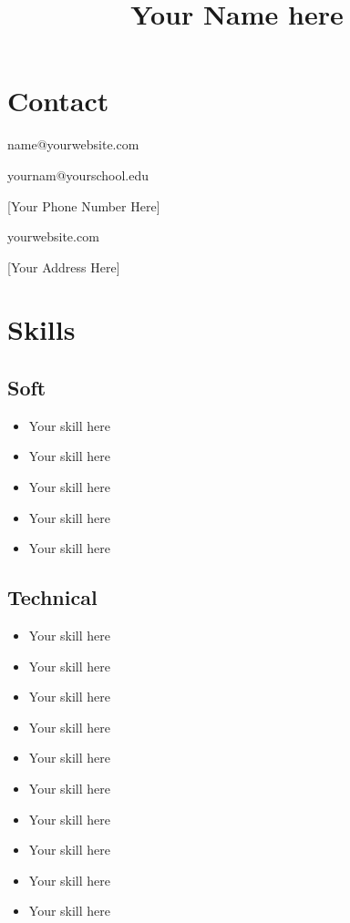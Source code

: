 \documentclass[12pt, letterpaper]{memoir}
\title{Your Name here}
\author{}
\date{}
\begin{document}
\maketitle

\hspace{-8mm}
\begin{minipage}[t]{0.3\textwidth}
\section*{Contact}
\vspace{-.5\baselineskip}
 name@yourwebsite.com
\vspace{.5\baselineskip}

 yournam@yourschool.edu
\vspace{.5\baselineskip}

 [Your Phone Number Here]
\vspace{.5\baselineskip}

 yourwebsite.com
\vspace{.5\baselineskip}

 [Your Address Here]

\vspace{.5\baselineskip}
\section*{Skills}
\vspace{-.5\baselineskip}

\subsection{Soft}
\vspace{-.5\baselineskip}
\begin{itemize}[itemsep=-1mm]
	\item Your skill here
	\item Your skill here
	\item Your skill here
	\item Your skill here
	\item Your skill here
\end{itemize}
\vspace{-1.75\baselineskip}
\subsection{Technical}
\begin{itemize}[itemsep=-1mm]
	\item Your skill here
	\item Your skill here
	\item Your skill here
	\item Your skill here
	\item Your skill here
	\item Your skill here
	\item Your skill here
	\item Your skill here
	\item Your skill here
	\item Your skill here
\end{itemize}
\vspace{-1.75\baselineskip}

\end{minipage}
\end{document}
